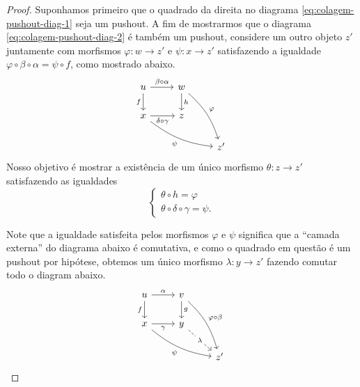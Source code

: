  \begin{proof}
   Suponhamos primeiro que o quadrado da direita no diagrama \eqref{eq:colagem-pushout-diag-1} seja um pushout.
   A fim de mostrarmos que o diagrama \eqref{eq:colagem-pushout-diag-2} é também um pushout, considere um outro objeto $z'$ juntamente com morfismos $\varphi: w \to z'$ e $\psi: x \to z'$ satisfazendo a igualdade $\varphi \circ \beta \circ \alpha = \psi \circ f$, como mostrado abaixo.
   \begin{displaymath}
     \begin{tikzcd}
        u
       \arrow[r, "\beta \circ \alpha"]
       \arrow[d, "f" swap]
       & w
       \arrow[d, "h"]
       \arrow[rdd, bend left=15, "\varphi"]
       \\ x
       \arrow[r, "\delta \circ \gamma" swap]
       \arrow[rrd, bend right=15, "\psi" swap]
       & z
       \\ & & z'
     \end{tikzcd}
   \end{displaymath}
   Nosso objetivo é mostrar a existência de um único morfismo $\theta: z \to z'$ satisfazendo as igualdades
   \begin{equation}
     \label{eq:colagem-pushout-objetivo-1}
     \begin{cases}
       \theta \circ h = \varphi \\
       \theta \circ \delta \circ \gamma = \psi.
      \end{cases}
   \end{equation}

   Note que a igualdade satisfeita pelos morfismos $\varphi$ e $\psi$ significa que a ``camada externa'' do diagrama abaixo é comutativa, e como o quadrado em questão é um pushout por hipótese, obtemos um único morfismo $\lambda: y \to z'$ fazendo comutar todo o diagram abaixo.
   \begin{equation}\label{eq:colagem-pushout-morfismo-lambda}
     \begin{tikzcd}
       u
       \arrow[r, "\alpha"]
       \arrow[d, "f" swap]
       & v
       \arrow[d, "g"]
       \arrow[rdd, bend left=15, "\varphi \circ \beta"]
       \\ x
       \arrow[r, "\gamma" swap]
       \arrow[rrd, bend right=15, "\psi" swap]
       & y
       \arrow[rd, dashed, "\lambda" description]
       \\ & & z'
     \end{tikzcd}
   \end{equation}


\end{proof}
